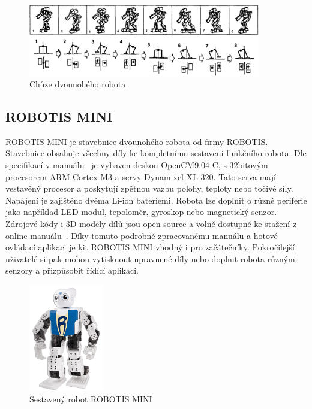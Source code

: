 \begin{figure}[hbt]
	\centering
	\includegraphics[width=0.9\textwidth]{obrazky-figures/bipedwalk.png}
	\caption{Chůze dvounohého robota \cite{TwoarmedBipedal}}
	\label{bipedwalk}
\end{figure}

\subsection*{ROBOTIS MINI}
ROBOTIS MINI je stavebnice dvounohého robota od firmy ROBOTIS. Stavebnice obsahuje všechny díly ke kompletnímu sestavení funkčního robota. Dle specifikací v manuálu~\cite{RobotisMini} je vybaven deskou OpenCM9.04-C, s 32bitovým procesorem ARM Cortex-M3 a servy Dynamixel XL-320. Tato serva mají vestavěný procesor a poskytují zpětnou vazbu polohy, teploty nebo točivé síly. Napájení je zajištěno dvěma Li-ion bateriemi. Robota lze doplnit o různé periferie jako například LED modul, tepoloměr, gyroskop nebo magnetický senzor. Zdrojové kódy i 3D modely dílů jsou open source a volně dostupné ke stažení z online manuálu~\cite{RobotisMini}. Díky tomuto podrobně zpracovanému manuálu a hotové ovládací aplikaci je kit ROBOTIS MINI vhodný i pro začátečníky. Pokročilejší uživatelé si pak mohou vytisknout upravnené díly nebo doplnit robota různými senzory  a přizpůsobit řídící aplikaci.

\begin{figure}[hbt]
	\centering
	\includegraphics[width=0.29\textwidth]{obrazky-figures/robotismini.png}
	\caption[robotis]{Sestavený robot ROBOTIS MINI \cite{RobotisMini}}
	\label{robotismini}
\end{figure}


